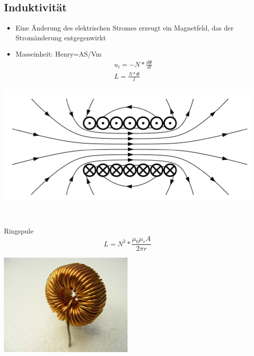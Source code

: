 \subsection{Induktivität}
\begin{minipage}{9cm}
\begin{itemize}
  \item Eine Änderung des elektrischen Stromes erzeugt ein Magnetfeld, das der
  Stromänderung entgegenwirkt
  \item Masseinheit: Henry=AS/Vm
  \begin{gather}
  u_{i}=-N*\frac{d\Phi}{dt}\\
  L=\frac{N*\Phi}{I}
  \end{gather}
\end{itemize}
\end{minipage}
\begin{minipage}{9cm}
\includegraphics[scale=0.4]{pictures/induktivitaet}
\end{minipage}
\\
\begin{minipage}{9cm}
Ringspule\\
\begin{equation}
L=N^2*\frac{\mu_{0}\mu_{r}A}{2\pi r}
\end{equation}
\end{minipage}
\begin{minipage}{9cm}
\includegraphics[scale=0.4]{pictures/ringspule}
\end{minipage}
